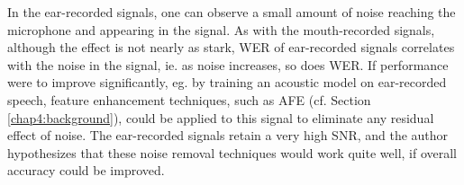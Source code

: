 % 

In the ear-recorded signals, one can observe a small amount of noise reaching the microphone and appearing in the signal.  As with the mouth-recorded signals, although the effect is not nearly as stark, WER of ear-recorded signals correlates with the noise in the signal, ie. as noise increases, so does WER.  If performance were to improve significantly, eg. by training an acoustic model on ear-recorded speech, feature enhancement techniques, such as AFE (cf. Section \ref{chap4:background}), could be applied to this signal to eliminate any residual effect of noise.  The ear-recorded signals retain a very high SNR, and the author hypothesizes that these noise removal techniques would work quite well, if overall accuracy could be improved.


